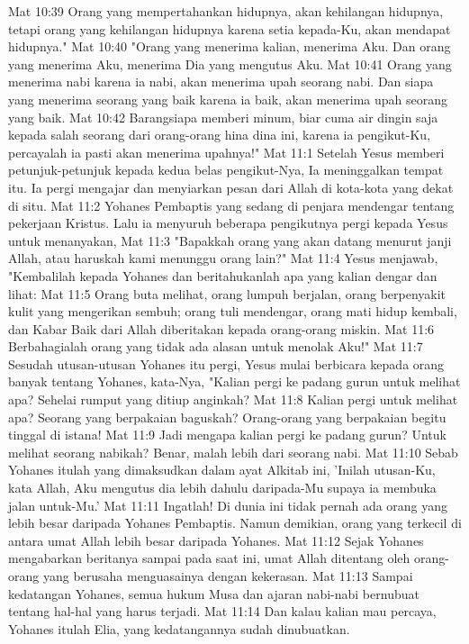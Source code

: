 Mat 10:39  Orang yang mempertahankan hidupnya, akan kehilangan hidupnya, tetapi orang yang kehilangan hidupnya karena setia kepada-Ku, akan mendapat hidupnya."
Mat 10:40  "Orang yang menerima kalian, menerima Aku. Dan orang yang menerima Aku, menerima Dia yang mengutus Aku.
Mat 10:41  Orang yang menerima nabi karena ia nabi, akan menerima upah seorang nabi. Dan siapa yang menerima seorang yang baik karena ia baik, akan menerima upah seorang yang baik.
Mat 10:42  Barangsiapa memberi minum, biar cuma air dingin saja kepada salah seorang dari orang-orang hina dina ini, karena ia pengikut-Ku, percayalah ia pasti akan menerima upahnya!"
Mat 11:1  Setelah Yesus memberi petunjuk-petunjuk kepada kedua belas pengikut-Nya, Ia meninggalkan tempat itu. Ia pergi mengajar dan menyiarkan pesan dari Allah di kota-kota yang dekat di situ.
Mat 11:2  Yohanes Pembaptis yang sedang di penjara mendengar tentang pekerjaan Kristus. Lalu ia menyuruh beberapa pengikutnya pergi kepada Yesus untuk menanyakan,
Mat 11:3  "Bapakkah orang yang akan datang menurut janji Allah, atau haruskah kami menunggu orang lain?"
Mat 11:4  Yesus menjawab, "Kembalilah kepada Yohanes dan beritahukanlah apa yang kalian dengar dan lihat:
Mat 11:5  Orang buta melihat, orang lumpuh berjalan, orang berpenyakit kulit yang mengerikan sembuh; orang tuli mendengar, orang mati hidup kembali, dan Kabar Baik dari Allah diberitakan kepada orang-orang miskin.
Mat 11:6  Berbahagialah orang yang tidak ada alasan untuk menolak Aku!"
Mat 11:7  Sesudah utusan-utusan Yohanes itu pergi, Yesus mulai berbicara kepada orang banyak tentang Yohanes, kata-Nya, "Kalian pergi ke padang gurun untuk melihat apa? Sehelai rumput yang ditiup anginkah?
Mat 11:8  Kalian pergi untuk melihat apa? Seorang yang berpakaian baguskah? Orang-orang yang berpakaian begitu tinggal di istana!
Mat 11:9  Jadi mengapa kalian pergi ke padang gurun? Untuk melihat seorang nabikah? Benar, malah lebih dari seorang nabi.
Mat 11:10  Sebab Yohanes itulah yang dimaksudkan dalam ayat Alkitab ini, 'Inilah utusan-Ku, kata Allah, Aku mengutus dia lebih dahulu daripada-Mu supaya ia membuka jalan untuk-Mu.'
Mat 11:11  Ingatlah! Di dunia ini tidak pernah ada orang yang lebih besar daripada Yohanes Pembaptis. Namun demikian, orang yang terkecil di antara umat Allah lebih besar daripada Yohanes.
Mat 11:12  Sejak Yohanes mengabarkan beritanya sampai pada saat ini, umat Allah ditentang oleh orang-orang yang berusaha menguasainya dengan kekerasan.
Mat 11:13  Sampai kedatangan Yohanes, semua hukum Musa dan ajaran nabi-nabi bernubuat tentang hal-hal yang harus terjadi.
Mat 11:14  Dan kalau kalian mau percaya, Yohanes itulah Elia, yang kedatangannya sudah dinubuatkan.
